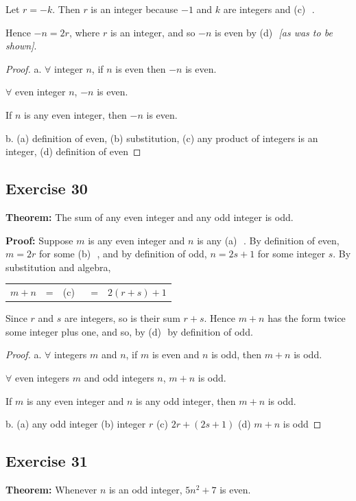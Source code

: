 \documentclass[14pt]{extarticle}
\newcommand{\fbl}{\underline{\hspace{1cm}}\,\,}
\newcommand{\fa}{\forall}
\newcommand{\cy}{\color{cyan}}
\begin{document}
Let $r = -k$. Then $r$ is an integer because $-1$ and $k$ are integers and {\cy (c)} \fbl. 

Hence $-n = 2r$, where $r$ is an integer, and so $-n$ is even by {\cy (d)} \fbl {\it [as was to be shown]}.

\begin{proof}
a. $\fa$ integer $n$, if $n$ is even then $-n$ is even.

$\fa$ even integer $n$, $-n$ is even.

If $n$ is any even integer, then $-n$ is even.

b. (a) definition of even, (b) substitution, (c) any product of integers is an integer, (d) definition of even
\end{proof}

\subsection{Exercise 30}
{\bf Theorem:} The sum of any even integer and any odd integer is odd.

{\bf Proof:} Suppose $m$ is any even integer and $n$ is any {\cy (a)} \fbl. By definition of even, $m = 2r$ for some {\cy (b)} \fbl, and by definition of odd, $n = 2s + 1$ for some integer $s$. By substitution and algebra,

\begin{center}
\begin{tabular}{ccccc}
$m+n$ & = & {\cy (c)} \fbl & = & $2(r+s)+1$ \\
\end{tabular}
\end{center}

Since $r$ and $s$ are integers, so is their sum $r+s$. Hence $m+n$ has the form twice some integer plus one, and so, by {\cy (d)} \fbl by definition of odd.

\begin{proof}
a. $\fa$ integers $m$ and $n$, if $m$ is even and $n$ is odd, then $m + n$ is odd.

$\fa$ even integers $m$ and odd integers $n$, $m + n$ is odd.

If $m$ is any even integer and $n$ is any odd integer,
then $m + n$ is odd.

b. (a) any odd integer (b) integer $r$ (c) $2r + (2s + 1)$ (d) $m + n$ is odd
\end{proof}

\subsection{Exercise 31}
{\bf Theorem:} Whenever $n$ is an odd integer, $5n^2 + 7$ is even.
\end{document}
